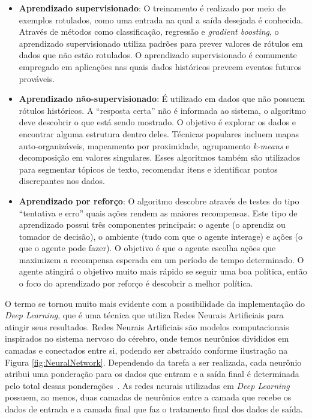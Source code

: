 \documentclass[portugues]{ic-tese}
\begin{document}
\begin{itemize}
\item \textbf{Aprendizado supervisionado}: O treinamento é realizado por meio de exemplos rotulados, como uma entrada na qual a saída desejada é conhecida. Através de métodos como classificação, regressão e \textit{gradient boosting}, o aprendizado supervisionado utiliza padrões para prever valores de rótulos em dados que não estão rotulados. O aprendizado supervisionado é comumente empregado em aplicações nas quais dados históricos preveem eventos futuros prováveis.
\item \textbf{Aprendizado não-supervisionado}: É utilizado em dados que não possuem rótulos históricos. A “resposta certa” não é informada ao sistema, o algoritmo deve descobrir o que está sendo mostrado. O objetivo é explorar os dados e encontrar alguma estrutura dentro deles. Técnicas populares incluem mapas auto-organizáveis, mapeamento por proximidade, agrupamento \textit{k-means} e decomposição em valores singulares. Esses algoritmos também são utilizados para segmentar tópicos de texto, recomendar itens e identificar pontos discrepantes nos dados.
\item \textbf{Aprendizado por reforço}: O algoritmo descobre através de testes do tipo “tentativa e erro” quais ações rendem as maiores recompensas. Este tipo de aprendizado possui três componentes principais: o agente (o aprendiz ou tomador de decisão), o ambiente (tudo com que o agente interage) e ações (o que o agente pode fazer). O objetivo é que o agente escolha ações que maximizem a recompensa esperada em um período de tempo determinado. O agente atingirá o objetivo muito mais rápido se seguir uma boa política, então o foco do aprendizado por reforço é descobrir a melhor política.
\end{itemize}

O termo se tornou muito mais evidente com a possibilidade da implementação do \textit{Deep Learning}, que é uma técnica que utiliza Redes Neurais Artificiais para atingir seus resultados. Redes Neurais Artificiais são modelos computacionais inspirados no sistema nervoso do cérebro, onde temos neurônios divididos em camadas e conectados entre si, podendo ser abstraído conforme ilustração na Figura \ref{fig:NeuralNetwork}. Dependendo da tarefa a ser realizada, cada neurônio atribui uma ponderação para os dados que entram e a saída final é determinada pelo total dessas ponderações~\citep{Copeland_2016}. As redes neurais utilizadas em \textit{Deep Learning} possuem, ao menos, duas camadas de neurônios entre a camada que recebe os dados de entrada e a camada final que faz o tratamento final dos dados de saída.
\end{document}
